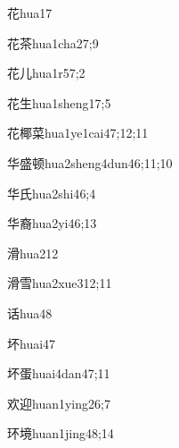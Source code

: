 \begin{verbete}{花}{hua1}{7}
\end{verbete}
\begin{verbete}{花茶}{hua1cha2}{7;9}
\end{verbete}
\begin{verbete}{花儿}{hua1r5}{7;2}
\end{verbete}
\begin{verbete}{花生}{hua1sheng1}{7;5}
\end{verbete}
\begin{verbete}{花椰菜}{hua1ye1cai4}{7;12;11}
\end{verbete}
\begin{verbete}{华盛顿}{hua2sheng4dun4}{6;11;10}
\end{verbete}
\begin{verbete}{华氏}{hua2shi4}{6;4}
\end{verbete}
\begin{verbete}{华裔}{hua2yi4}{6;13}
\end{verbete}
\begin{verbete}{滑}{hua2}{12}
\end{verbete}
\begin{verbete}{滑雪}{hua2xue3}{12;11}
\end{verbete}
\begin{verbete}{话}{hua4}{8}
\end{verbete}
\begin{verbete}{坏}{huai4}{7}
\end{verbete}
\begin{verbete}{坏蛋}{huai4dan4}{7;11}
\end{verbete}
\begin{verbete}{欢迎}{huan1ying2}{6;7}
\end{verbete}
\begin{verbete}{环境}{huan1jing4}{8;14}
\end{verbete}
